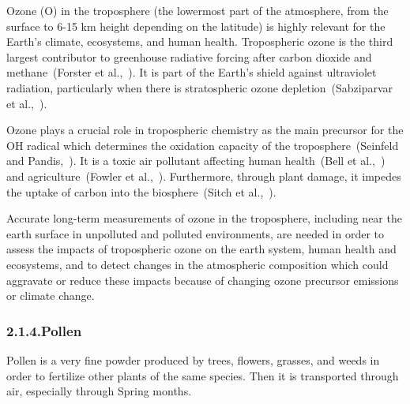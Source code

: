\documentclass[9pt]{report}
\begin{document}
\noindent{}Ozone (O) in the troposphere (the lowermost part of the atmosphere, from the surface to 6-15 km height depending on the latitude) is highly relevant for the Earth’s climate, ecosystems, and human health.
Tropospheric ozone is the third largest contributor to greenhouse radiative forcing after carbon dioxide and methane~(Forster et al.,~).
It is part of the Earth’s shield against ultraviolet radiation, particularly when there is stratospheric ozone depletion~(Sabziparvar et al.,~).%

Ozone plays a crucial role in tropospheric chemistry as the main precursor for the OH radical which determines the oxidation capacity of the troposphere~(Seinfeld and Pandis,~).
It is a toxic air pollutant affecting human health~(Bell et al.,~) and agriculture~(Fowler et al.,~).
Furthermore, through plant damage, it impedes the uptake of carbon into the biosphere~(Sitch et al.,~).%

Accurate long-term measurements of ozone in the troposphere, including near the earth surface in unpolluted and polluted environments, are needed in order to assess the impacts of tropospheric ozone on the earth system, human health and ecosystems, and to detect changes in the atmospheric composition which could aggravate or reduce these impacts because of changing ozone precursor emissions or climate change.%

\subsubsection{2.1.4.\hspace*{0.5em}Pollen}\label{sec-pollen}%

\noindent{}Pollen is a very fine powder produced by trees, flowers, grasses, and weeds in order to fertilize other plants of the same species.
Then it is transported through air, especially through Spring months.%
\end{document}
